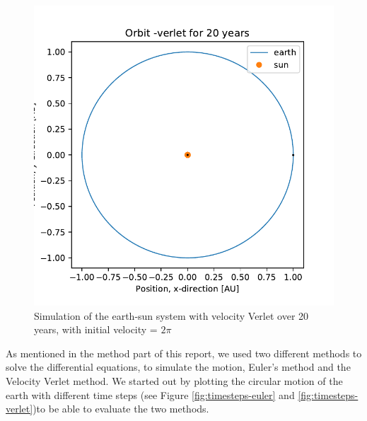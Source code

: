 \begin{figure}
	\centering
	\includegraphics[width=1\linewidth]{../results/plots/plotof-earthsun-verlet}
	\caption{Simulation of the earth-sun system with velocity Verlet over 20 years, with initial velocity = $ 2\pi $}
	\label{fig:plotof-earthsun-verlet}
\end{figure}


As mentioned in the method part of this report, we used two different methods to solve the differential equations, to simulate the motion, Euler's method and the Velocity Verlet method. We started out by plotting the circular motion of the earth with different time steps (see Figure \ref{fig:timesteps-euler} and \ref{fig:timesteps-verlet})to be able to evaluate the two methods.
	
